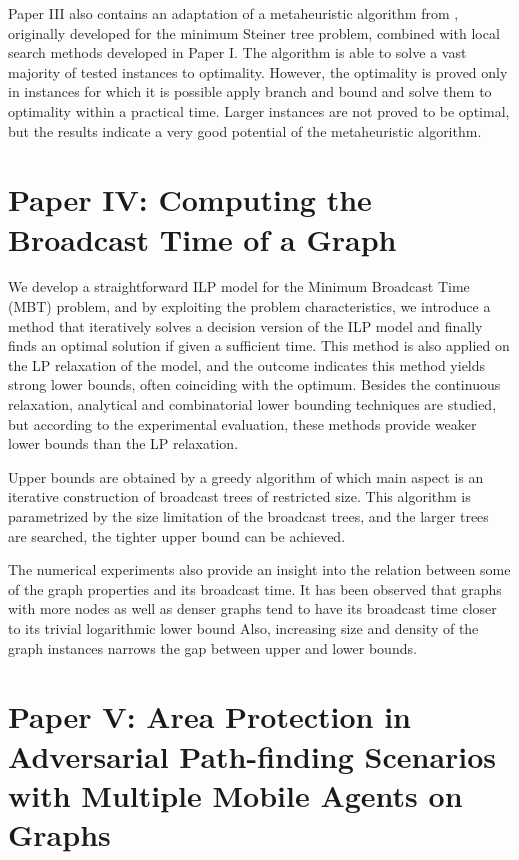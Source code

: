 Paper III also contains an adaptation of a metaheuristic algorithm from \cite{pajor18}, originally developed for the minimum Steiner tree problem, 
combined with local search methods developed in Paper I.
The algorithm is able to solve a vast majority of tested instances to optimality. 
However, the optimality is proved only in instances for which it is possible apply branch and bound and solve them to optimality within a practical time.
Larger instances are not proved to be optimal, but the results indicate a very good potential of the metaheuristic algorithm. 
%
%
\section{Paper IV: Computing the Broadcast Time of a Graph}

We develop a straightforward ILP model for the Minimum Broadcast Time (MBT) problem, and by exploiting the problem characteristics, 
we introduce a method that iteratively solves a decision version of the ILP model and finally finds an optimal solution if given a sufficient time.
This method is also applied on the LP relaxation of the model, and the outcome indicates this method yields strong lower bounds, often coinciding with the optimum.
Besides the continuous relaxation, analytical and combinatorial lower bounding techniques are studied, 
but according to the experimental evaluation, these methods provide weaker lower bounds than the LP relaxation.

Upper bounds are obtained by a greedy algorithm of which main aspect is an iterative construction of broadcast trees of restricted size.
This algorithm is parametrized by the size limitation of the broadcast trees, and the larger trees are searched, the tighter upper bound can be achieved.

The numerical experiments also provide an insight into the relation between some of the graph properties and its broadcast time. 
It has been observed that graphs with more nodes as well as denser graphs tend to have its broadcast time closer to its trivial logarithmic lower bound 
Also, increasing size and density of the graph instances narrows the gap between upper and lower bounds.


%
%
\section{Paper V: Area Protection in Adversarial Path-finding Scenarios with Multiple Mobile Agents on Graphs}

